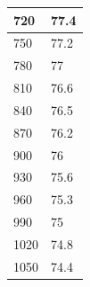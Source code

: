 \documentclass{report}
\begin{document}
{\begin{tabular}{|l|l|}
720           & 77.4                 \\ \hline
750           & 77.2                 \\ \hline
780           & 77                   \\ \hline
810           & 76.6                 \\ \hline
840           & 76.5                 \\ \hline
870           & 76.2                 \\ \hline
900           & 76                   \\ \hline
930           & 75.6                 \\ \hline
960           & 75.3                 \\ \hline
990           & 75                   \\ \hline
1020          & 74.8                 \\ \hline
1050          & 74.4                 \\ \hline
\end{tabular}
}
\pagebreak
\end{document}
